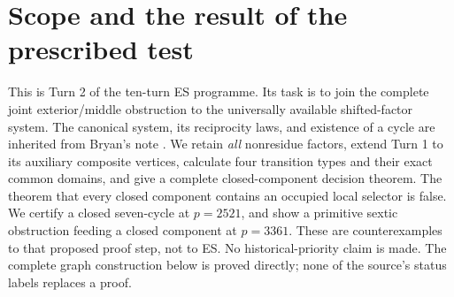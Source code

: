 \section{Scope and the result of the prescribed test}
This is Turn 2 of the ten-turn ES programme. Its task is to join the complete
joint exterior/middle obstruction to the universally available shifted-factor
system. The canonical system, its reciprocity laws, and existence of a cycle
are inherited from Bryan's note \cite[\S\S1--7]{BryanGraph}. We retain \emph{all}
nonresidue factors, extend Turn 1 to its auxiliary composite vertices, calculate
four transition types and their exact common domains, and give a complete
closed-component decision theorem. The theorem that every closed component
contains an occupied local selector is false. We certify a closed seven-cycle
at $p=2521$, and show a primitive sextic obstruction feeding a closed component
at $p=3361$. These are counterexamples to that proposed proof step, not to ES.
No historical-priority claim is made. The complete graph construction below is
proved directly; none of the source's status labels replaces a proof.

